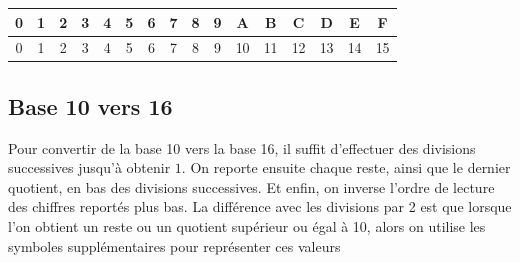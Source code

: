 \documentclass[11pt,a4paper]{article}
\begin{document}
\begin{center}
\begin{tabular}{ | c c c c c | c c c c c | c c c c c c | }
\hline
\textbf{0} & \textbf{1} & \textbf{2} & \textbf{3} & \textbf{4}  &  \textbf{5} & \textbf{6} & \textbf{7} & \textbf{8} & \textbf{9}  &   \textbf{A} &  \textbf{B} &  \textbf{C} &  \textbf{D} &  \textbf{E} &  \textbf{F} \\
\hline
0 & 1 & 2 & 3 & 4  &  5 & 6 & 7 & 8 & 9  &  10 & 11 & 12 & 13 & 14 & 15 \\
\hline
\end{tabular}
\end{center}

\bigskip


\subsection{Base 10 vers 16}

\bigskip

Pour convertir de la base 10 vers la base 16, il suffit d'effectuer des divisions successives jusqu'à obtenir $ 1 $.
On reporte ensuite chaque reste, ainsi que le dernier quotient, en bas des divisions successives.
Et enfin, on inverse l'ordre de lecture des chiffres reportés plus bas.
La différence avec les divisions par 2 est que lorsque l'on obtient un reste ou un quotient supérieur ou égal à 10, alors on utilise les symboles supplémentaires pour représenter ces valeurs

\bigskip
\end{document}
